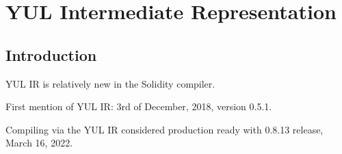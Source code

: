 \chapter*{YUL Intermediate Representation} 


\section*{Introduction}
YUL IR is relatively new in the Solidity compiler.

First mention of YUL IR: 3rd of December, 2018, version 0.5.1.

Compiling via the YUL IR considered production ready with 0.8.13 release, March 16, 2022.



















